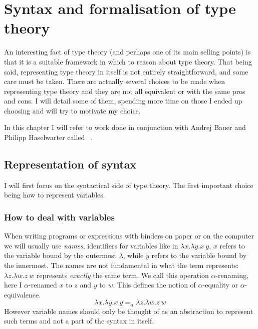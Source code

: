 \chapter{Syntax and formalisation of type theory}

An interesting fact of type theory (and perhaps one of its main selling points)
is that it is a suitable framework in which to reason about type theory.
That being said, representing type theory in itself is not entirely
straightforward, and some care must be taken. There are actually several choices
to be made when representing type theory and they are not all equivalent or with
the same pros and cons.
I will detail some of them, spending more time on those I ended up choosing
and will try to motivate my choice.

In this chapter I will refer to work done in conjunction with Andrej Bauer and
Philipp Haselwarter called \ftt~.

\section{Representation of syntax}

I will first focus on the syntactical side of type theory.
The first important choice being how to represent variables.

\subsection{How to deal with variables}

When writing programs or expressions with binders on paper or on the computer
we will usually use \emph{names}, identifiers for variables like in
\(\lambda x. \lambda y. x\ y\), \(x\) refers to the variable bound by the
outermost \(\lambda\), while \(y\) refers to the variable bound by the
innermost.
The names are not fundamental in what the term represents:
\(\lambda z. \lambda w. z\ w\) represents \emph{exactly} the same term.
We call this operation \(\alpha\)-renaming, here I \(\alpha\)-renamed \(x\)
to \(z\) and \(y\) to \(w\). This defines the notion of \(\alpha\)-equality
or \(\alpha\)-equivalence.
\[
  \lambda x. \lambda y. x\ y =_\alpha \lambda z. \lambda w. z\ w
\]
However variable names should only be thought of as an abstraction to represent
such terms and not a part of the syntax in itself.

